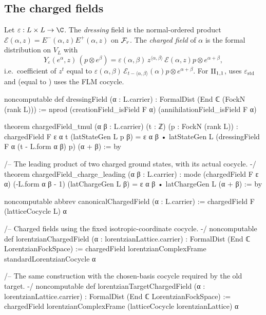 \subsection{The charged fields}

\begin{definition}\label{ch17:def:charged}
Let $\varepsilon:L\times L\to\C$.  The \emph{dressing} field is the normal-ordered product
$\mathcal E(\alpha,z)=E^-(\alpha,z)E^+(\alpha,z)$ on $\mathcal{F}_r$.  The \emph{charged field} of $\alpha$ is the
formal distribution on $V_L$ with
\begin{equation}\label{ch17:eq:chargedfield}
  Y_\varepsilon(e^\alpha,z)\,(p\otimes e^\beta) = \varepsilon(\alpha,\beta)\,z^{\langle\alpha,\beta\rangle}\,
  \mathcal E(\alpha,z)p\otimes e^{\alpha+\beta},
\end{equation}
i.e.\ coefficient of $z^t$ equal to $\varepsilon(\alpha,\beta)\,\mathcal E_{t-\langle\alpha,\beta\rangle}(\alpha)p\otimes e^{\alpha+\beta}$.
For ${\mathrm{II}_{1,1}}$,  uses $\varepsilon_{\mathrm{std}}$ and
 (equal to ) uses the
FLM cocycle.
\end{definition}

\begin{leancode}
noncomputable def dressingField (α : L.carrier) : FormalDist (End ℂ (FockN (rank L))) :=
  nprod (creationField_isField F α) (annihilationField_isField F α)

theorem chargedField_tmul (α β : L.carrier) (t : ℤ) (p : FockN (rank L)) :
    chargedField F ε α t (latStateGen L p β)
      = ε α β • latStateGen L (dressingField F α (t - L.form α β) p) (α + β) := by

/-- The leading product of two charged ground states, with its actual cocycle. -/
theorem chargedField_charge_leading (α β : L.carrier) :
    mode (chargedField F ε α) (-L.form α β - 1) (latChargeGen L β) =
      ε α β • latChargeGen L (α + β) := by

noncomputable abbrev canonicalChargedField (α : L.carrier) :=
  chargedField F (latticeCocycle L) α

/-- Charged fields using the fixed isotropic-coordinate cocycle. -/
noncomputable def lorentzianChargedField (α : lorentzianLattice.carrier) :
    FormalDist (End ℂ LorentzianFockSpace) :=
  chargedField lorentzianComplexFrame standardLorentzianCocycle α

/-- The same construction with the chosen-basis cocycle required by the old target. -/
noncomputable def lorentzianTargetChargedField (α : lorentzianLattice.carrier) :
    FormalDist (End ℂ LorentzianFockSpace) :=
  chargedField lorentzianComplexFrame (latticeCocycle lorentzianLattice) α
\end{leancode}

